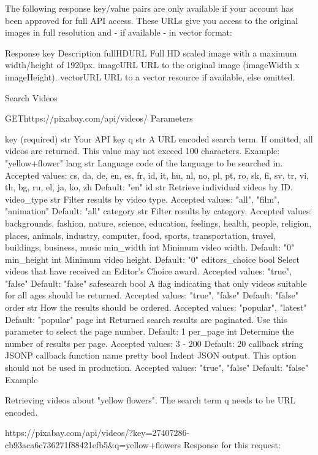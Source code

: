 The following response key/value pairs are only available if your account has been approved for full API access. These URLs give you access to the original images in full resolution and - if available - in vector format:

Response key	Description
fullHDURL	Full HD scaled image with a maximum width/height of 1920px.
imageURL	URL to the original image (imageWidth x imageHeight).
vectorURL	URL to a vector resource if available, else omitted.




Search Videos

GEThttps://pixabay.com/api/videos/
Parameters

key (required)	str	Your API key
q	str	A URL encoded search term. If omitted, all videos are returned. This value may not exceed 100 characters. 
Example: "yellow+flower"
lang	str	Language code of the language to be searched in. 
Accepted values: cs, da, de, en, es, fr, id, it, hu, nl, no, pl, pt, ro, sk, fi, sv, tr, vi, th, bg, ru, el, ja, ko, zh 
Default: "en"
id	str	Retrieve individual videos by ID.
video_type	str	Filter results by video type. 
Accepted values: "all", "film", "animation" 
Default: "all"
category	str	Filter results by category. 
Accepted values: backgrounds, fashion, nature, science, education, feelings, health, people, religion, places, animals, industry, computer, food, sports, transportation, travel, buildings, business, music
min_width	int	Minimum video width. 
Default: "0"
min_height	int	Minimum video height. 
Default: "0"
editors_choice	bool	Select videos that have received an Editor's Choice award. 
Accepted values: "true", "false" 
Default: "false"
safesearch	bool	A flag indicating that only videos suitable for all ages should be returned. 
Accepted values: "true", "false" 
Default: "false"
order	str	How the results should be ordered. 
Accepted values: "popular", "latest" 
Default: "popular"
page	int	Returned search results are paginated. Use this parameter to select the page number. 
Default: 1
per_page	int	Determine the number of results per page. 
Accepted values: 3 - 200 
Default: 20
callback	string	JSONP callback function name
pretty	bool	Indent JSON output. This option should not be used in production. 
Accepted values: "true", "false" 
Default: "false"
Example

Retrieving videos about "yellow flowers". The search term q needs to be URL encoded.

https://pixabay.com/api/videos/?key=27407286-cb93aca6c736271f88421efb5&q=yellow+flowers
Response for this request:

